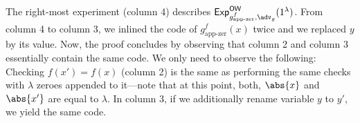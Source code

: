 \begin{center}
	\begin{pchstack}
		\pchspace
		\pchspace
		\pchspace
	\end{pchstack}
\end{center}

The right-most experiment (column 4) describes ${\mathsf{Exp}}_{g^f_{\text{app-zer}},\adv_g}^{\mathsf{OW}}(1^\lambda)$.
From column 4 to column 3, we inlined the code of $g^f_{\text{app-zer}}(x)$ twice and we replaced $y$ by its value. Now, the proof concludes by observing that column 2 and column 3 essentially contain the same code. We only need to observe the following: Checking $f(x')=f(x)$ (column 2) is the same as performing the same checks with $\lambda$ zeroes appended to it---note that at this point, both, $\abs{x}$ and  $\abs{x'}$ are equal to $\lambda$. In column 3, if we additionally rename variable $y$ to $y'$, we yield the same code.
